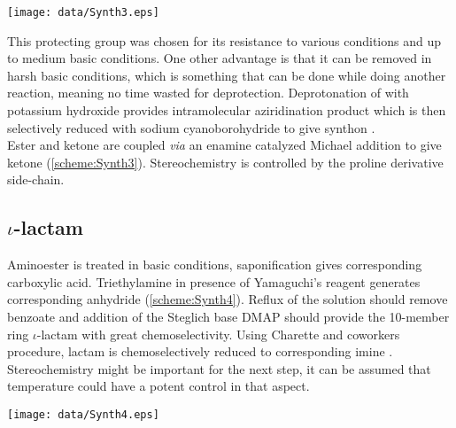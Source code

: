 \vspace{-20pt}
\begin{figure''}
\centering
		\texttt{[image: data/Synth3.eps]}
    \label{scheme:Synth3}
\end{figure''}
\newpage
This protecting group was chosen for its resistance to various conditions and up to medium basic conditions. One other advantage is that it can be removed in harsh basic conditions, which is something that can be done while doing another reaction, meaning no time wasted for deprotection. Deprotonation of  with potassium hydroxide provides intramolecular aziridination product  which is then selectively reduced with sodium cyanoborohydride  to give synthon \autocite{Iqbal02}.\\
Ester  and ketone  are coupled \textit{via} an enamine catalyzed Michael addition to give ketone  (\ref{scheme:Synth3}). Stereochemistry is controlled by the proline derivative side-chain\autocite{Nayak16}.
\subsection*{$\iota$-lactam}
Aminoester  is treated in basic conditions, saponification gives corresponding carboxylic acid. Triethylamine in presence of Yamaguchi's reagent  generates corresponding anhydride  (\ref{scheme:Synth4}). Reflux of the solution should remove benzoate and addition of the Steglich base DMAP should provide the 10-member ring $\iota$-lactam  with great chemoselectivity. Using Charette and coworkers procedure\autocite{Charette10}, lactam is chemoselectively reduced to corresponding imine . Stereochemistry might be important for the next step, it can be assumed that temperature could have a potent control in that aspect.
\begin{figure''}
\centering
		\texttt{[image: data/Synth4.eps]}
    \label{scheme:Synth4}
\end{figure''}

